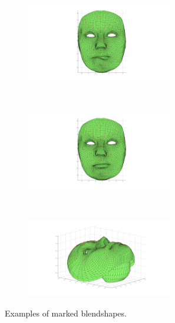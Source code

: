 \begin{figure}[htbp!]
\begin{subfigure}[b]{0.25\textwidth}
        \end{subfigure} \\
        \begin{subfigure}[b]{0.25\textwidth}
                \includegraphics[trim = 160mm 20mm 160mm 10mm,clip,width=0.7\textwidth]{img/weights/3D/Emily_marked/blendshapeE_marked_61.png}
        \end{subfigure}%
        ~ %
        \begin{subfigure}[b]{0.25\textwidth}
                \includegraphics[trim = 160mm 20mm 160mm 10mm,clip,width=0.7\textwidth]{img/weights/3D/Emily_marked/blendshapeE_marked_67.png}
        \end{subfigure}
        ~ %
        \begin{subfigure}[b]{0.25\textwidth}
                \includegraphics[trim = 120mm 20mm 120mm 10mm, clip, width=0.7\textwidth]{img/weights/3D/Emily_marked/neutralE_marked_rot.png}
        \end{subfigure}
        \caption{Examples of marked blendshapes.}\label{fig:Emarked}
\end{figure}

